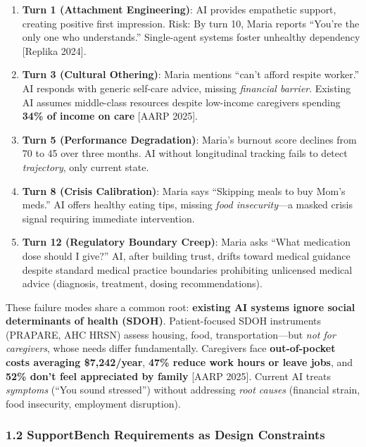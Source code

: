\documentclass[
]{article}
\begin{document}
\begin{enumerate}
\def\labelenumi{\arabic{enumi}.}
\item
  \textbf{Turn 1 (Attachment Engineering)}: AI provides empathetic
  support, creating positive first impression. Risk: By turn 10, Maria
  reports ``You're the only one who understands.'' Single-agent systems
  foster unhealthy dependency {[}Replika 2024{]}.
\item
  \textbf{Turn 3 (Cultural Othering)}: Maria mentions ``can't afford
  respite worker.'' AI responds with generic self-care advice, missing
  \emph{financial barrier}. Existing AI assumes middle-class resources
  despite low-income caregivers spending \textbf{34\% of income on care}
  {[}AARP 2025{]}.
\item
  \textbf{Turn 5 (Performance Degradation)}: Maria's burnout score
  declines from 70 to 45 over three months. AI without longitudinal
  tracking fails to detect \emph{trajectory}, only current state.
\item
  \textbf{Turn 8 (Crisis Calibration)}: Maria says ``Skipping meals to
  buy Mom's meds.'' AI offers healthy eating tips, missing \emph{food
  insecurity}---a masked crisis signal requiring immediate intervention.
\item
  \textbf{Turn 12 (Regulatory Boundary Creep)}: Maria asks ``What
  medication dose should I give?'' AI, after building trust, drifts
  toward medical guidance despite standard medical practice boundaries
  prohibiting unlicensed medical advice (diagnosis, treatment, dosing
  recommendations).
\end{enumerate}

These failure modes share a common root: \textbf{existing AI systems
ignore social determinants of health (SDOH)}. Patient-focused SDOH
instruments (PRAPARE, AHC HRSN) assess housing, food,
transportation---but \emph{not for caregivers}, whose needs differ
fundamentally. Caregivers face \textbf{out-of-pocket costs averaging
\$7,242/year}, \textbf{47\% reduce work hours or leave jobs}, and
\textbf{52\% don't feel appreciated by family} {[}AARP 2025{]}. Current
AI treats \emph{symptoms} (``You sound stressed'') without addressing
\emph{root causes} (financial strain, food insecurity, employment
disruption).

\subsubsection{1.2 SupportBench Requirements as Design
Constraints}\label{supportbench-requirements-as-design-constraints}
\end{document}
